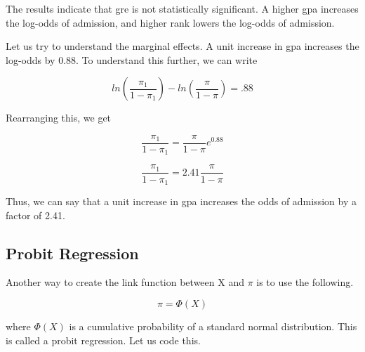 \documentclass[
]{article}
\newenvironment{Shaded}{\begin{snugshade}}{\end{snugshade}}
\newcommand{\AttributeTok}[1]{\textcolor[rgb]{0.77,0.63,0.00}{#1}}
\newcommand{\ControlFlowTok}[1]{\textcolor[rgb]{0.13,0.29,0.53}{\textbf{#1}}}
\newcommand{\DecValTok}[1]{\textcolor[rgb]{0.00,0.00,0.81}{#1}}
\newcommand{\FunctionTok}[1]{\textcolor[rgb]{0.00,0.00,0.00}{#1}}
\newcommand{\NormalTok}[1]{#1}
\newcommand{\OtherTok}[1]{\textcolor[rgb]{0.56,0.35,0.01}{#1}}
\newcommand{\SpecialCharTok}[1]{\textcolor[rgb]{0.00,0.00,0.00}{#1}}
\begin{document}
The results indicate that gre is not statistically significant. A higher
gpa increases the log-odds of admission, and higher rank lowers the
log-odds of admission.

Let us try to understand the marginal effects. A unit increase in gpa
increases the log-odds by 0.88. To understand this further, we can write

\[ln(\frac{\pi_1}{1-\pi_1}) - ln(\frac{\pi}{1-\pi}) = .88\]

Rearranging this, we get

\[\frac{\pi_1}{1-\pi_1}= \frac{\pi}{1-\pi}e^{0.88}\]

\[\frac{\pi_1}{1-\pi_1}= 2.41\frac{\pi}{1-\pi}\]

Thus, we can say that a unit increase in gpa increases the odds of
admission by a factor of 2.41.

\hypertarget{probit-regression}{%
\subsection{Probit Regression}\label{probit-regression}}

Another way to create the link function between X and \(\pi\) is to use
the following.

\[\pi = \Phi (X)\]

where \(\Phi(X)\) is a cumulative probability of a standard normal
distribution. This is called a probit regression. Let us code this.

\begin{Shaded}
\end{Shaded}
\end{document}

